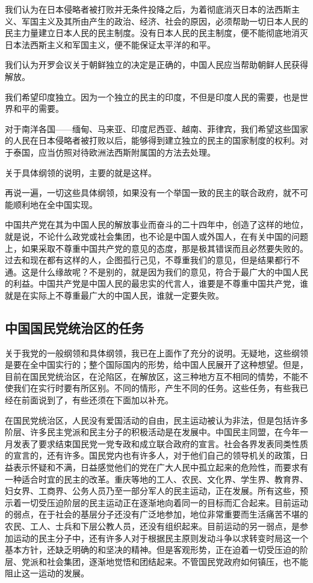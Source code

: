 我们认为在日本侵略者被打败并无条件投降之后，为着彻底消灭日本的法西斯主义、军国主义及其所由产生的政治、经济、社会的原因，必须帮助一切日本人民的民主力量建立日本人民的民主制度。没有日本人民的民主制度，便不能彻底地消灭日本法西斯主义和军国主义，便不能保证太平洋的和平。

我们认为开罗会议关于朝鲜独立的决定是正确的，中国人民应当帮助朝鲜人民获得解放。

我们希望印度独立。因为一个独立的民主的印度，不但是印度人民的需要，也是世界和平的需要。

对于南洋各国——缅甸、马来亚、印度尼西亚、越南、菲律宾，我们希望这些国家的人民在日本侵略者被打败以后，能够得到建立独立的民主的国家制度的权利。对于泰国，应当仿照对待欧洲法西斯附属国的方法去处理。

关于具体纲领的说明，主要的就是这样。

再说一遍，一切这些具体纲领，如果没有一个举国一致的民主的联合政府，就不可能顺利地在全中国实现。

中国共产党在其为中国人民的解放事业而奋斗的二十四年中，创造了这样的地位，就是说，不论什么政党或社会集团，也不论是中国人或外国人，在有关中国的问题上，如果采取不尊重中国共产党的意见的态度，那是极其错误而且必然要失败的。过去和现在都有这样的人，企图孤行己见，不尊重我们的意见，但是结果都行不通。这是什么缘故呢？不是别的，就是因为我们的意见，符合于最广大的中国人民的利益。中国共产党是中国人民的最忠实的代言人，谁要是不尊重中国共产党，谁就是在实际上不尊重最广大的中国人民，谁就一定要失败。

\subsection{中国国民党统治区的任务}

关于我党的一般纲领和具体纲领，我已在上面作了充分的说明。无疑地，这些纲领是要在全中国实行的；整个国际国内的形势，给中国人民展开了这种想望。但是，目前在国民党统治区，在沦陷区，在解放区，这三种地方互不相同的情势，不能不使我们在实行时要有所区别。不同的情形，产生不同的任务。这些任务，有些我已经在前面说到了，有些还须在下面加以补充。

在国民党统治区，人民没有爱国活动的自由，民主运动被认为非法，但是包括许多阶层、许多民主党派和民主分子的积极活动是在发展中。中国民主同盟，在今年一月发表了要求结束国民党一党专政和成立联合政府的宣言。社会各界发表同类性质的宣言的，还有许多。国民党内也有许多人，对于他们自己的领导机关的政策，日益表示怀疑和不满，日益感觉他们的党在广大人民中孤立起来的危险性，而要求有一种适合时宜的民主的改革。重庆等地的工人、农民、文化界、学生界、教育界、妇女界、工商界、公务人员乃至一部分军人的民主运动，正在发展。所有这些，预示着一切受压迫阶层的民主运动正在逐渐地向着同一的目标而汇合起来。目前运动的弱点，在于社会的基层分子还没有广泛地参加，地位非常重要而生活痛苦不堪的农民、工人、士兵和下层公教人员，还没有组织起来。目前运动的另一弱点，是参加运动的民主分子中，还有许多人对于根据民主原则发动斗争以求转变时局这一个基本方针，还缺乏明确的和坚决的精神。但是客观形势，正在迫着一切受压迫的阶层、党派和社会集团，逐渐地觉悟和团结起来。不管国民党政府如何镇压，也不能阻止这一运动的发展。

